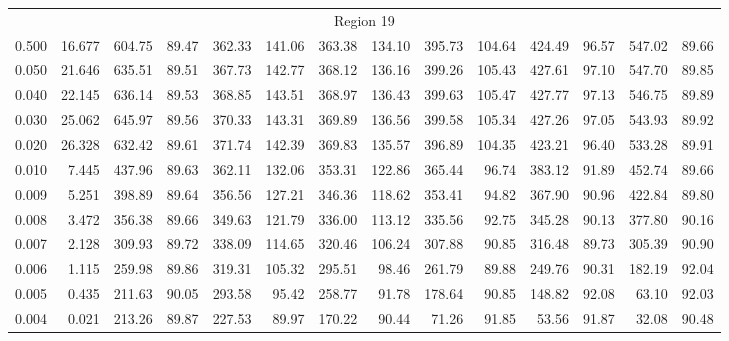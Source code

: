 \begin{tabular}{@{}lrrrrrrrrrrrrr@{}}
\midrule
\multicolumn{14}{c}{Region 19} \\
\cmidrule{1-14}
0.500 & 16.677 & 604.75 & 89.47 & 362.33 & 141.06 & 363.38 & 134.10 & 395.73 & 104.64 & 424.49 & 96.57 & 547.02 & 89.66 \\
0.050 & 21.646 & 635.51 & 89.51 & 367.73 & 142.77 & 368.12 & 136.16 & 399.26 & 105.43 & 427.61 & 97.10 & 547.70 & 89.85 \\
0.040 & 22.145 & 636.14 & 89.53 & 368.85 & 143.51 & 368.97 & 136.43 & 399.63 & 105.47 & 427.77 & 97.13 & 546.75 & 89.89 \\
0.030 & 25.062 & 645.97 & 89.56 & 370.33 & 143.31 & 369.89 & 136.56 & 399.58 & 105.34 & 427.26 & 97.05 & 543.93 & 89.92 \\
0.020 & 26.328 & 632.42 & 89.61 & 371.74 & 142.39 & 369.83 & 135.57 & 396.89 & 104.35 & 423.21 & 96.40 & 533.28 & 89.91 \\
0.010 & 7.445 & 437.96 & 89.63 & 362.11 & 132.06 & 353.31 & 122.86 & 365.44 & 96.74 & 383.12 & 91.89 & 452.74 & 89.66 \\
0.009 & 5.251 & 398.89 & 89.64 & 356.56 & 127.21 & 346.36 & 118.62 & 353.41 & 94.82 & 367.90 & 90.96 & 422.84 & 89.80 \\
0.008 & 3.472 & 356.38 & 89.66 & 349.63 & 121.79 & 336.00 & 113.12 & 335.56 & 92.75 & 345.28 & 90.13 & 377.80 & 90.16 \\
0.007 & 2.128 & 309.93 & 89.72 & 338.09 & 114.65 & 320.46 & 106.24 & 307.88 & 90.85 & 316.48 & 89.73 & 305.39 & 90.90 \\
0.006 & 1.115 & 259.98 & 89.86 & 319.31 & 105.32 & 295.51 & 98.46 & 261.79 & 89.88 & 249.76 & 90.31 & 182.19 & 92.04 \\
0.005 & 0.435 & 211.63 & 90.05 & 293.58 & 95.42 & 258.77 & 91.78 & 178.64 & 90.85 & 148.82 & 92.08 & 63.10 & 92.03 \\
0.004 & 0.021 & 213.26 & 89.87 & 227.53 & 89.97 & 170.22 & 90.44 & 71.26 & 91.85 & 53.56 & 91.87 & 32.08 & 90.48 \\


\end{tabular}
